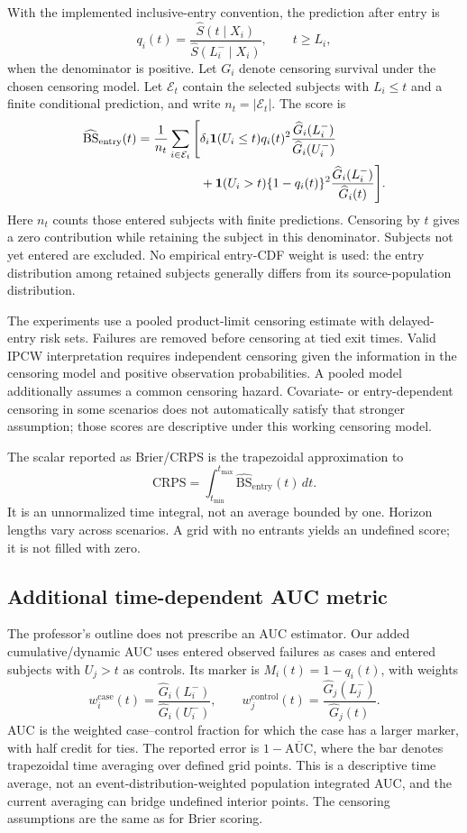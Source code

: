 With the implemented inclusive-entry convention, the prediction after
entry is
\[
 q_i(t)=\frac{\widehat S(t\mid X_i)}
                  {\widehat S(L_i^-\mid X_i)},\qquad t\geq L_i,
\]
when the denominator is positive. Let $G_i$ denote censoring survival under
the chosen censoring model. Let $\mathcal E_t$ contain the selected subjects with $L_i\leq t$ and a
finite conditional prediction, and write $n_t=|\mathcal E_t|$. The score is
\begin{align}
 \widehat{\mathrm{BS}}_{\mathrm{entry}}(t)
 =\frac{1}{n_t}\sum_{i\in\mathcal E_t}
 \Bigg[&
 \delta_i\mathbf{1}(U_i\leq t)q_i(t)^2
        \frac{\widehat G_i(L_i^-)}{\widehat G_i(U_i^-)}
 \nonumber\\
 &+\mathbf{1}(U_i>t)\{1-q_i(t)\}^2
        \frac{\widehat G_i(L_i^-)}{\widehat G_i(t)}
 \Bigg].
\end{align}
Here $n_t$ counts those entered subjects with finite predictions. Censoring
by $t$ gives a zero contribution while retaining the subject in this
denominator. Subjects not yet entered are excluded. No empirical entry-CDF
weight is used: the entry distribution among retained subjects generally
differs from its source-population distribution.

The experiments use a pooled product-limit censoring estimate with
delayed-entry risk sets. Failures are removed before censoring at tied exit
times. Valid IPCW interpretation requires independent censoring given the
information in the censoring model and positive observation probabilities.
A pooled model additionally assumes a common censoring hazard. Covariate-
or entry-dependent censoring in some scenarios does not automatically
satisfy that stronger assumption; those scores are descriptive under this
working censoring model.

The scalar reported as Brier/CRPS is the trapezoidal approximation to
\[
 \mathrm{CRPS}=\int_{t_{\min}}^{t_{\max}}
                  \widehat{\mathrm{BS}}_{\mathrm{entry}}(t)\,dt.
\]
It is an unnormalized time integral, not an average bounded by one.
Horizon lengths vary across scenarios. A grid with no entrants yields an
undefined score; it is not filled with zero.

\subsection{Additional time-dependent AUC metric}
The professor's outline does not prescribe an AUC estimator. Our added
cumulative/dynamic AUC uses entered observed failures as cases and entered
subjects with $U_j>t$ as controls. Its marker is $M_i(t)=1-q_i(t)$, with
weights
\[
 w_i^{\mathrm{case}}(t)=
 \frac{\widehat G_i(L_i^-)}{\widehat G_i(U_i^-)},\qquad
 w_j^{\mathrm{control}}(t)=
 \frac{\widehat G_j(L_j^-)}{\widehat G_j(t)}.
\]
AUC is the weighted case--control fraction for which the case has a larger
marker, with half credit for ties. The reported error is
$1-\overline{\mathrm{AUC}}$, where the bar denotes trapezoidal time
averaging over defined grid points. This is a descriptive time average,
not an event-distribution-weighted population integrated AUC, and the
current averaging can bridge undefined interior points. The censoring
assumptions are the same as for Brier scoring.

